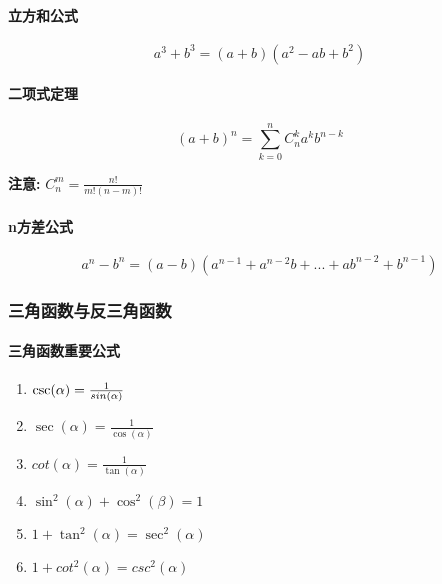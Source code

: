 \documentclass[
]{article}
\begin{document}
\hypertarget{ux7acbux65b9ux548cux516cux5f0f}{%
\paragraph{立方和公式}\label{ux7acbux65b9ux548cux516cux5f0f}}

\[a^3+b^3 = (a+b)(a^2-ab+b^2)\]

\hypertarget{ux4e8cux9879ux5f0fux5b9aux7406}{%
\paragraph{二项式定理}\label{ux4e8cux9879ux5f0fux5b9aux7406}}

\[(a+b)^n= \sum_{k=0}^{n}C_n^ka^kb^{n-k}\]

\textbf{注意:} \(C^m_n=\frac{n!}{m!(n-m)!}\)

\hypertarget{nux65b9ux5deeux516cux5f0f--p14ux5fc3ux4e00ux57faux7840ux8bb2ux4e49--}{%
\paragraph{n方差公式}\label{nux65b9ux5deeux516cux5f0f--p14ux5fc3ux4e00ux57faux7840ux8bb2ux4e49--}}

\[a^n-b^n=(a-b)(a^{n-1}+a^{n-2}b+...+ab^{n-2}+b^{n-1})\]

\hypertarget{ux4e09ux89d2ux51fdux6570ux4e0eux53cdux4e09ux89d2ux51fdux6570}{%
\subsubsection{三角函数与反三角函数}\label{ux4e09ux89d2ux51fdux6570ux4e0eux53cdux4e09ux89d2ux51fdux6570}}

\hypertarget{ux4e09ux89d2ux51fdux6570ux91cdux8981ux516cux5f0f}{%
\paragraph{三角函数重要公式}\label{ux4e09ux89d2ux51fdux6570ux91cdux8981ux516cux5f0f}}

\begin{enumerate}
\def\labelenumi{\arabic{enumi}.}
\item
  \(\csc(\alpha)=\frac{1}{\\sin(\alpha)}\)
\item
  \(\sec(\alpha)=\frac{1}{\cos(\alpha)}\)
\item
  \(cot(\alpha)=\frac{1}{\tan(\alpha)}\)
\item
  \(\sin^2(\alpha)+\cos^2(\beta)=1\)
\item
  \(1+\tan^2(\alpha)=\sec^2(\alpha)\)
\item
  \(1+cot^2(\alpha)=csc^2(\alpha)\)
\end{enumerate}
\end{document}
